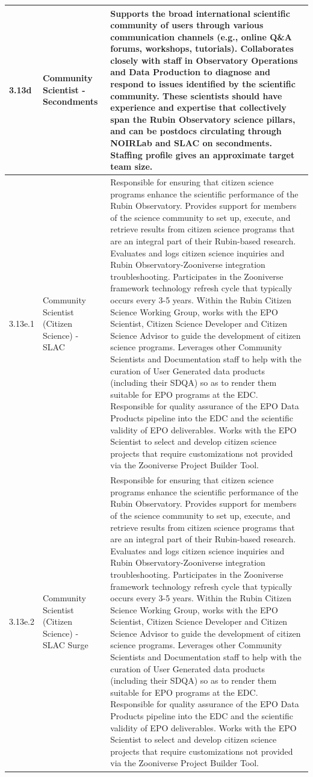 \begin{longtable} {|p{}|p{}|p{}|}
{3.13d}&{Community Scientist - Secondments}&{Supports the broad international scientific community of users through various communication channels (e.g., online Q\&A forums, workshops, tutorials). Collaborates closely with staff in Observatory Operations and Data Production to diagnose and respond to issues identified by the scientific community.  These scientists should have experience and expertise that collectively span the Rubin Observatory science pillars, and can be postdocs circulating through NOIRLab and SLAC on secondments. Staffing profile gives an approximate target team size.} \\ \hline
{3.13e.1}&{Community Scientist (Citizen Science) - SLAC}&{Responsible for ensuring that citizen science programs enhance the scientific performance of the Rubin Observatory. Provides support for members of the science community to set up, execute, and retrieve results from citizen science programs that are an integral part of their Rubin-based research. Evaluates and logs citizen science inquiries and Rubin Observatory-Zooniverse integration troubleshooting. Participates in the Zooniverse framework technology refresh cycle that typically occurs every 3-5 years. Within the Rubin Citizen Science Working Group,  works with the EPO Scientist, Citizen Science Developer and Citizen Science Advisor to guide the development of citizen science programs. Leverages other Community Scientists and Documentation staff to help with the curation of User Generated data products (including their SDQA) so as to render them suitable for EPO programs at the EDC. Responsible for quality assurance of the EPO Data Products pipeline into the EDC and the scientific validity of EPO deliverables. Works with the EPO Scientist to select and develop citizen science projects that require customizations not provided via the Zooniverse Project Builder Tool.} \\ \hline
{3.13e.2}&{Community Scientist (Citizen Science) - SLAC Surge}&{Responsible for ensuring that citizen science programs enhance the scientific performance of the Rubin Observatory. Provides support for members of the science community to set up, execute, and retrieve results from citizen science programs that are an integral part of their Rubin-based research. Evaluates and logs citizen science inquiries and Rubin Observatory-Zooniverse integration troubleshooting. Participates in the Zooniverse framework technology refresh cycle that typically occurs every 3-5 years. Within the Rubin Citizen Science Working Group,  works with the EPO Scientist, Citizen Science Developer and Citizen Science Advisor to guide the development of citizen science programs. Leverages other Community Scientists and Documentation staff to help with the curation of User Generated data products (including their SDQA) so as to render them suitable for EPO programs at the EDC. Responsible for quality assurance of the EPO Data Products pipeline into the EDC and the scientific validity of EPO deliverables. Works with the EPO Scientist to select and develop citizen science projects that require customizations not provided via the Zooniverse Project Builder Tool.} \\ \hline

\end{longtable}
